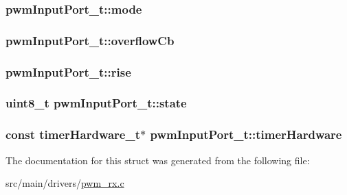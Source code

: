 \hypertarget{structpwmInputPort__t_ae9f4ba92912b5f730c1e0c417c12c05e}{
\subsubsection[{mode}]{ pwm\+Input\+Port\+\_\+t\+::mode}}\label{structpwmInputPort__t_ae9f4ba92912b5f730c1e0c417c12c05e}
\hypertarget{structpwmInputPort__t_a144abb430bf38e93db011a43ab16a414}{
\subsubsection[{overflow\+Cb}]{ pwm\+Input\+Port\+\_\+t\+::overflow\+Cb}}\label{structpwmInputPort__t_a144abb430bf38e93db011a43ab16a414}
\hypertarget{structpwmInputPort__t_a36ed724daac84e1fdff43f3dbace1569}{
\subsubsection[{rise}]{ pwm\+Input\+Port\+\_\+t\+::rise}}\label{structpwmInputPort__t_a36ed724daac84e1fdff43f3dbace1569}
\hypertarget{structpwmInputPort__t_a2e33ec4ef4817f2005980594f413008c}{
\subsubsection[{state}]{\setlength{\rightskip}{0pt plus 5cm}uint8\+\_\+t pwm\+Input\+Port\+\_\+t\+::state}}\label{structpwmInputPort__t_a2e33ec4ef4817f2005980594f413008c}
\hypertarget{structpwmInputPort__t_a9bc8732db80b1422b581d537c2d23598}{
\subsubsection[{timer\+Hardware}]{\setlength{\rightskip}{0pt plus 5cm}const {\bf timer\+Hardware\+\_\+t}$\ast$ pwm\+Input\+Port\+\_\+t\+::timer\+Hardware}}\label{structpwmInputPort__t_a9bc8732db80b1422b581d537c2d23598}


The documentation for this struct was generated from the following file\+:\begin{DoxyCompactItemize}
\item 
src/main/drivers/\hyperlink{pwm__rx_8c}{pwm\+\_\+rx.\+c}\end{DoxyCompactItemize}
